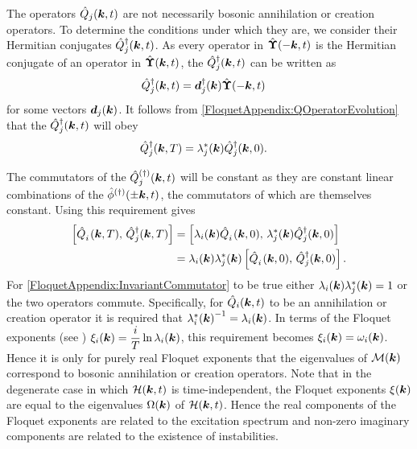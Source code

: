 The operators $\hat{Q}_j(\bm{k}, t)$ are not necessarily bosonic annihilation or creation operators. To determine the conditions under which they are, we consider their Hermitian conjugates $\hat{Q}_j^\dagger(\bm{k}, t)$. As every operator in $\hat{\bm{\Upsilon}}(-\bm{k}, t)$ is the Hermitian conjugate of an operator in $\hat{\bm{\Upsilon}}(\bm{k}, t)$, the $\hat{Q}_j^\dagger(\bm{k}, t)$ can be written as
\begin{align}
    \label{FloquetAppendix:QDaggerDefinition}
    \hat{Q}_j^\dagger(\vect{k}, t) &= \vect{d}_j^\dagger(\vect{k}) \hat{\vect{\Upsilon}}(-\vect{k}, t)
\end{align}
for some vectors $\bm{d}_j(\bm{k})$. It follows from \eqref{FloquetAppendix:QOperatorEvolution} that the $\hat{Q}_j^\dagger(\bm{k}, t)$ will obey
\begin{align}
    \label{FloquetAppendix:QDaggerEvolution}
    \hat{Q}_j^\dagger(\vect{k}, T) &= \lambda_j^*(\vect{k}) \hat{Q}_j^\dagger(\vect{k}, 0).
\end{align}

The commutators of the $\hat{Q}_j^{(\dagger)}(\bm{k}, t)$ will be constant as they are constant linear combinations of the $\hat{\phi}^{(\dagger)}(\pm\bm{k}, t)$, the commutators of which are themselves constant. Using this requirement gives
\begin{align}
    \left[ \hat{Q}_i^{\phantom{\dagger}}(\vect{k}, T),\, \hat{Q}_j^\dagger(\vect{k}, T) \right] &= \left[ \lambda_i(\vect{k}) \hat{Q}_i^{\phantom{\dagger}}(\vect{k}, 0),\, \lambda_j^*(\vect{k}) \hat{Q}_j^\dagger(\vect{k}, 0)\right]\\
        &= \lambda_i(\vect{k}) \lambda_j^*(\vect{k}) \left[ \hat{Q}_i^{\phantom{\dagger}}(\vect{k}, 0),\, \hat{Q}_j^\dagger(\vect{k}, 0)\right].
        \label{FloquetAppendix:InvariantCommutator}
\end{align}
For \eqref{FloquetAppendix:InvariantCommutator} to be true either $\lambda_i(\bm{k}) \lambda_j^*(\bm{k}) = 1$ or the two operators commute. Specifically, for $\hat{Q}_i(\bm{k}, t)$ to be an annihilation or creation operator it is required that ${\lambda_i^*(\bm{k})}^{-1} = \lambda_i(\bm{k})$. In terms of the Floquet exponents (see ) $\displaystyle \xi_i(\bm{k}) = \frac{i}{T} \ln \lambda_i(\bm{k})$, this requirement becomes $\xi_i(\bm{k}) = \omega_i(\bm{k})$. Hence it is only for purely real Floquet exponents that the eigenvalues of $\mathcal{M}(\bm{k})$ correspond to bosonic annihilation or creation operators. Note that in the degenerate case in which $\mathcal{H}(\bm{k}, t)$ is time-independent, the Floquet exponents $\xi(\bm{k})$ are equal to the eigenvalues $\Omega(\bm{k})$ of $\mathcal{H}(\bm{k}, t)$. Hence the real components of the Floquet exponents are related to the excitation spectrum and non-zero imaginary components are related to the existence of instabilities.

